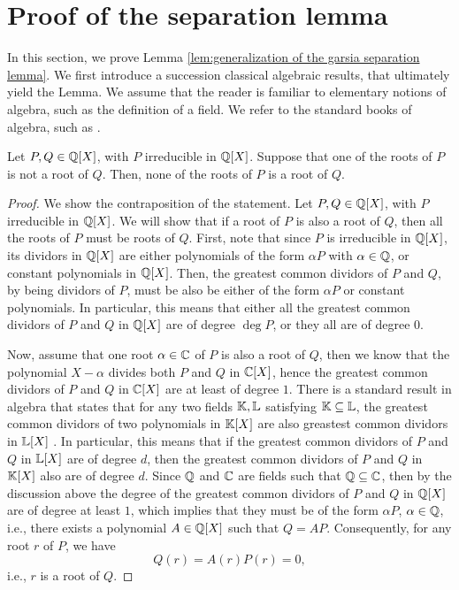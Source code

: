 
\section{Proof of the separation lemma}

\label{sec:app:separation lemma}

In this section, we prove Lemma \ref{lem:generalization of the garsia separation lemma}. We first introduce a succession classical algebraic results, that ultimately yield the Lemma. We assume that the reader is familiar to elementary notions of algebra, such as the definition of a field. We refer to the standard books of algebra, such as \cite{lang2002Algebra}.
\begin{lemma}\label{lem:from polynomials in q, one of the roots of the polynomial not being a root of another polynomial implies that all the roots are not the rroots of the other}
    Let $P,Q \in \mathbb{Q}[X]$, with $P$ irreducible in $\mathbb{Q}[X]$. Suppose that one of the roots of $P$ is not a root of $Q$. Then, none of the roots of $P$ is a root of $Q$.
\end{lemma}
\begin{proof}
    We show the contraposition of the statement. Let $P,Q \in \mathbb{Q}[X]$, with $P$ irreducible in $\mathbb{Q}[X]$. We will show that if a root of $P$ is also a root of $Q$, then all the roots of $P$ must be roots of $Q$. First, note that since $P$ is irreducible in $\mathbb{Q}[X]$, its dividors in $\mathbb{Q}[X]$ are either polynomials of the form $\alpha P$ with $\alpha \in \mathbb{Q}$, or constant polynomials in $\mathbb{Q}[X]$. Then, the greatest common dividors of $P$ and $Q$, by being dividors of $P$, must be also be either of the form $\alpha P$ or constant polynomials. In particular, this means that either all the greatest common dividors of $P$ and $Q$ in $\mathbb{Q}[X]$ are of degree $\deg P$, or they all are of degree $0$. 
    
    
    Now, assume that one root $\alpha \in \mathbb{C}$ of $P$ is also a root of $Q$, then we know that the polynomial $X - \alpha$ divides both $P$ and $Q$ in $\mathbb{C}[X]$, hence the greatest common dividors of $P$ and $Q$ in $\mathbb{C}[X]$ are at least of degree $1$. There is a standard result in algebra that states that for any two fields $\mathbb{K},\mathbb{L}$ satisfying $\mathbb{K} \subseteq \mathbb{L}$, the greatest common dividors of two polynomials in $\mathbb{K}[X]$ are also greastest common dividors in $\mathbb{L}[X]$ \cite[Section III-8, Proposition 3]{mazet1996capes}. In particular, this means that if the greatest common dividors of $P$ and $Q$ in $\mathbb{L}[X]$ are of degree $d$, then the greatest common dividors of $P$ and $Q$ in $\mathbb{K}[X]$ also are of degree $d$. Since $\mathbb{Q}$ and $\mathbb{C}$ are fields such that $\mathbb{Q} \subseteq \mathbb{C}$, then by the discussion above the degree of the greatest common dividors of $P$ and $Q$ in $\mathbb{Q}[X]$ are of degree at least $1$, which implies that they must be of the form $\alpha P$, $\alpha \in \mathbb{Q}$, i.e., there exists a polynomial $A \in \mathbb{Q}[X]$ such that $Q = AP$. Consequently, for any root $r$ of $P$, we have 
    \begin{equation}
        Q(r) = A(r) P(r) = 0,
    \end{equation}
    i.e., $r$ is a root of $Q$.
\end{proof}


